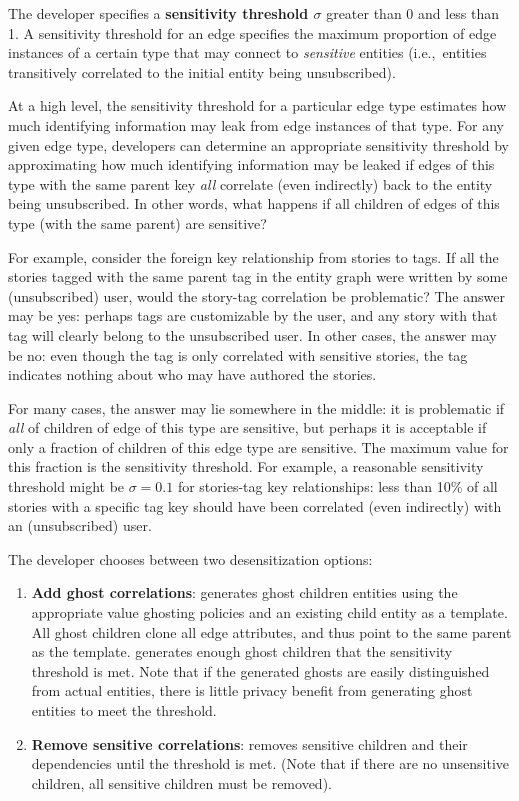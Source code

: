 The developer specifies a \textbf{sensitivity threshold $\sigma$} greater than 0 and less than 1.  A
sensitivity threshold for an edge specifies the maximum proportion of edge instances of a certain
type that may connect to \emph{sensitive} entities (i.e.,\ entities transitively correlated to the
initial entity being unsubscribed). 

At a high level, the sensitivity threshold for a particular edge type estimates how much identifying
information may leak from edge instances of that type.  For any given edge type, developers can
determine an appropriate sensitivity threshold by approximating how much identifying information may
be leaked if edges of this type with the same parent key \emph{all} correlate (even indirectly) back
to the entity being unsubscribed. In other words, what happens if all children of edges of this type
(with the same parent) are sensitive?

For example, consider the foreign key relationship from stories to tags. If all the stories tagged
with the same parent tag in the entity graph were written by some (unsubscribed) user, would the
story-tag correlation be problematic? The answer may be yes: perhaps tags are customizable by the
user, and any story with that tag will clearly belong to the unsubscribed user. In other cases, the
answer may be no: even though the tag is only correlated with sensitive stories, the tag indicates
nothing about who may have authored the stories.

For many cases, the answer may lie somewhere in the middle: it is problematic if \emph{all} of
children of edge of this type are sensitive, but perhaps it is acceptable if only a fraction of
children of this edge type are sensitive. The maximum value for this fraction is the sensitivity
threshold.  For example, a reasonable sensitivity threshold might be $\sigma = 0.1$ for stories-tag
key relationships: less than 10\% of all stories with a specific tag key should have been correlated
(even indirectly) with an (unsubscribed) user. 

The developer chooses between two desensitization options:
\begin{enumerate}
    \item \textbf{Add ghost correlations}: \sys generates ghost children entities using the
        appropriate value ghosting policies and an existing child entity as a template. All ghost
        children clone all edge attributes, and thus point to the same parent as the template. \sys
        generates enough ghost children that the sensitivity threshold is met.  Note that if the
        generated ghosts are easily distinguished from actual entities, there is little privacy
        benefit from generating ghost entities to meet the threshold.

\item \textbf{Remove sensitive correlations}: \sys removes sensitive children and their dependencies
    until the threshold is met. (Note that if there are no unsensitive children, all sensitive
        children must be removed).
\end{enumerate}

